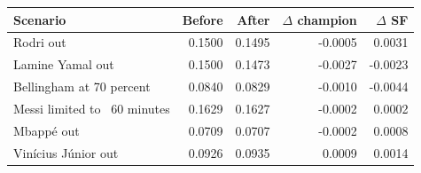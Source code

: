 \begin{tabular}{lrrrr}
\toprule
Scenario & Before & After & $\Delta$ champion & $\Delta$ SF \\
\midrule
Rodri out & 0.1500 & 0.1495 & -0.0005 & 0.0031 \\
Lamine Yamal out & 0.1500 & 0.1473 & -0.0027 & -0.0023 \\
Bellingham at 70 percent & 0.0840 & 0.0829 & -0.0010 & -0.0044 \\
Messi limited to ~60 minutes & 0.1629 & 0.1627 & -0.0002 & 0.0002 \\
Mbappé out & 0.0709 & 0.0707 & -0.0002 & 0.0008 \\
Vinícius Júnior out & 0.0926 & 0.0935 & 0.0009 & 0.0014 \\
\bottomrule
\end{tabular}

